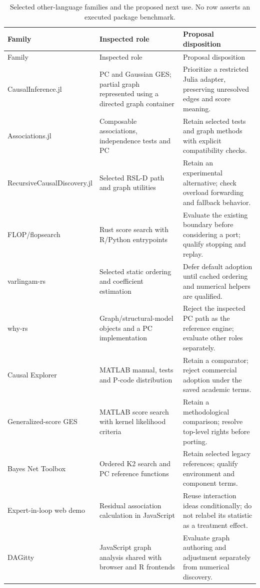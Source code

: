 \begingroup\small
\begin{longtable}{@{}p{.22\linewidth}p{.35\linewidth}p{.35\linewidth}@{}}
\caption{Selected other-language families and the proposed next use. No row
asserts an executed package benchmark.}\label{tab:exec13-other-roles}\\
\toprule Family & Inspected role & Proposal disposition\\
\midrule\endfirsthead
\toprule Family & Inspected role & Proposal disposition\\
\midrule\endhead
CausalInference.jl & PC and Gaussian GES; partial graph represented using a
directed graph container & Prioritize a restricted Julia adapter, preserving
unresolved edges and score meaning.\\
Associations.jl & Composable associations, independence tests and PC & Retain
selected tests and graph methods with explicit compatibility checks.\\
Recursive\allowbreak Causal\allowbreak Discovery.jl & Selected RSL-D path and graph utilities & Retain
an experimental alternative; check overload forwarding and fallback behavior.\\
FLOP/flopsearch & Rust score search with R/Python entrypoints & Evaluate the
existing boundary before considering a port; qualify stopping and replay.\\
varlingam-rs & Selected static ordering and coefficient estimation & Defer
default adoption until cached ordering and numerical helpers are qualified.\\
why-rs & Graph/structural-model objects and a PC implementation & Reject the
inspected PC path as the reference engine; evaluate other roles separately.\\
Causal Explorer & MATLAB manual, tests and P-code distribution & Retain a
comparator; reject commercial adoption under the saved academic terms.\\
Generalized-score GES & MATLAB score search with kernel likelihood criteria &
Retain a methodological comparison; resolve top-level rights before porting.\\
Bayes Net Toolbox & Ordered K2 search and PC reference functions & Retain
selected legacy references; qualify environment and component terms.\\
Expert-in-loop web demo & Residual association calculation in JavaScript &
Reuse interaction ideas conditionally; do not relabel its statistic as a
treatment effect.\\
DAGitty & JavaScript graph analysis shared with browser and R frontends &
Evaluate graph authoring and adjustment separately from numerical discovery.\\
\bottomrule
\end{longtable}
\endgroup

